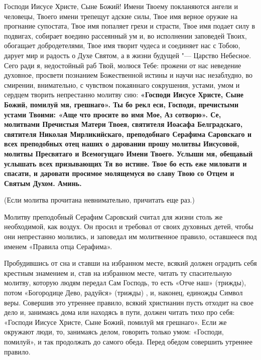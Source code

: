 Господи Иисусе Христе, Сыне Божий! Имени Твоему покланяются ангели и человецы, Твоего имени трепещут адские силы, Твое имя верное оружие на прогнание супостата, Твое имя попаляет грехи и страсти, Твое имя подает силу в подвигах, собирает воедино рассеянный ум и, во исполнении заповедей Твоих, обогащает добродетелями, Твое имя творит чудеса и соединяет нас с Тобою, дарует мир и радость о Духе Святом, а в жизни будущей "--- Царство Небесное. Сего ради я, недостойный раб Твой, молюся Тебе: прожени от нас неведение духовное, просвети познанием Божественной истины и научи нас незаблудно, во смирении, внимательно, с чувством покаяннаго сокрушения, устами, умом и сердцем творить непрестанно молитву сию: \bfseries «Господи Иисусе Христе, Сыне Божий, помилуй мя, грешнаго»\normalfont{}. Ты бо рекл еси, Господи, пречистыми устами Твоими: «Аще что просите во имя Мое, Аз сотворю». Се, молитвами Пречистыя Матери Твоея, святителя Иоасафа Белградскаго, святителя Николая Мирликийскаго, преподобнаго Серафима Саровскаго и всех преподобных отец наших о даровании прошу молитвы Иисусовой,  молитвы  Пресвятаго и Всемогущаго Имени Твоего. Услыши мя, обещавый услышать всех призывающих Тя во истине. Твое бо есть еже миловати и спасати, и даровати просимое молящемуся во славу Твою со Отцем и Святым Духом. Аминь. 






\itshape 


(Если молитва прочитана невнимательно, причитать еще раз.)

\normalfont{}


\mychapterending

 





Молитву преподобный Серафим Саровский считал для жизни столь же необходимой, как  воздух. Он просил и требовал от своих духовных детей, чтобы они непрестанно молились, и заповедал им молитвенное правило, оставшееся под именем «Правила отца Серафима». 

Пробудившись от сна и ставши на избранном месте, всякий должен оградить себя крестным знамением и, став на избранном месте, читать ту спасительную молитву, которую людям передал Сам Господь, то есть «Отче наш» (трижды), потом «Богородице Дево, радуйся» (трижды) , и, наконец, единожды Символ веры. Совершив это утреннее правило, всякий христианин пусть отходит на свое дело и, занимаясь дома или находясь в пути, должен читать тихо про себя: «Господи Иисусе Христе, Сыне Божий, помилуй мя грешнаго». Если же окружают люди, то, занимаясь делом, говорить только умом: «Господи, помилуй», и так продолжать до самого обеда. Перед обедом совершить утреннее правило. 

